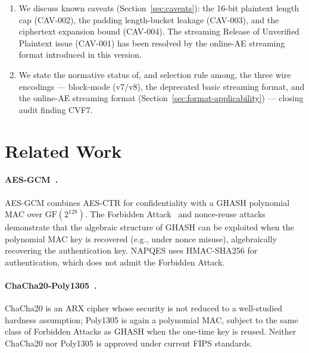 \documentclass[11pt,a4paper]{article}
\begin{document}
\begin{enumerate}
        bits of NAPQES ciphertext output (Section~\ref{sec:sts}), a
        30-vector KAT corpus (Section~\ref{sec:kats}), and a fuzz harness
        covering the full decoder pipeline (Section~\ref{sec:fuzz}).
  \item We discuss known caveats (Section~\ref{sec:caveats}): the 16-bit
        plaintext length cap (CAV-002), the padding length-bucket leakage
        (CAV-003), and the ciphertext expansion bound (CAV-004).  The
        streaming Release of Unverified Plaintext issue (CAV-001) has been
        resolved by the online-AE streaming format introduced in this version.
  \item We state the normative status of, and selection rule among, the
        three wire encodings — block-mode (v7/v8), the deprecated basic
        streaming format, and the online-AE streaming format
        (Section~\ref{sec:format-applicability}) — closing audit finding
        CVF7.
\end{enumerate}

\section{Related Work}
\label{sec:related}

\paragraph{AES-GCM~\cite{nist-gcm}.}
AES-GCM combines AES-CTR for confidentiality with a GHASH polynomial MAC
over $\mathrm{GF}(2^{128})$.  The Forbidden Attack~\cite{joux2006} and
nonce-reuse attacks~\cite{joux-nonce} demonstrate that the algebraic structure
of GHASH can be exploited when the polynomial MAC key is recovered (e.g.,
under nonce misuse), algebraically recovering the authentication key.
NAPQES uses HMAC-SHA256 for authentication, which does not admit the
Forbidden Attack.

\paragraph{ChaCha20-Poly1305~\cite{rfc7539}.}
ChaCha20 is an ARX cipher whose security is not reduced to a well-studied
hardness assumption; Poly1305 is again a polynomial MAC, subject to the same
class of Forbidden Attacks as GHASH when the one-time key is reused.  Neither
ChaCha20 nor Poly1305 is approved under current FIPS standards.
\end{document}
